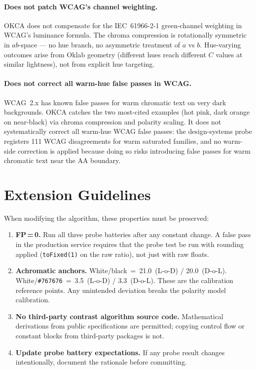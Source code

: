 \documentclass[11pt,a4paper]{article}
\begin{document}
\paragraph{Does not patch WCAG's channel weighting.}
OKCA does not compensate for the IEC~61966-2-1 green-channel weighting
in WCAG's luminance formula.  The chroma compression is rotationally
symmetric in $ab$-space --- no hue branch, no asymmetric treatment of
$a$ vs $b$.  Hue-varying outcomes arise from Oklab geometry (different
hues reach different $C$ values at similar lightness), not from explicit
hue targeting.

\paragraph{Does not correct all warm-hue false passes in WCAG.}
WCAG~2.x has known false passes for warm chromatic text on very dark
backgrounds.  OKCA catches the two most-cited examples (hot pink, dark
orange on near-black) via chroma compression and polarity scaling.  It
does not systematically correct all warm-hue WCAG false passes: the
design-systems probe registers 111 WCAG disagreements for warm saturated
families, and no warm-side correction is applied because doing so risks
introducing false passes for warm chromatic text near the AA boundary.

\section{Extension Guidelines}

When modifying the algorithm, these properties must be preserved:

\begin{enumerate}
  \item \textbf{FP\,=\,0.}  Run all three probe batteries after any
    constant change.  A false pass in the production service requires
    that the probe test be run with rounding applied
    (\texttt{toFixed(1)} on the raw ratio), not just with raw floats.

  \item \textbf{Achromatic anchors.}
    White/black~=~21.0~(L-o-D) / 20.0~(D-o-L).
    White/\texttt{\#767676}~=~3.5~(L-o-D) / 3.3~(D-o-L).
    These are the calibration reference points.  Any unintended deviation
    breaks the polarity model calibration.

  \item \textbf{No third-party contrast algorithm source code.}
    Mathematical derivations from public specifications are permitted;
    copying control flow or constant blocks from third-party packages is
    not.

  \item \textbf{Update probe battery expectations.}  If any probe result
    changes intentionally, document the rationale before committing.
\end{enumerate}
\end{document}
